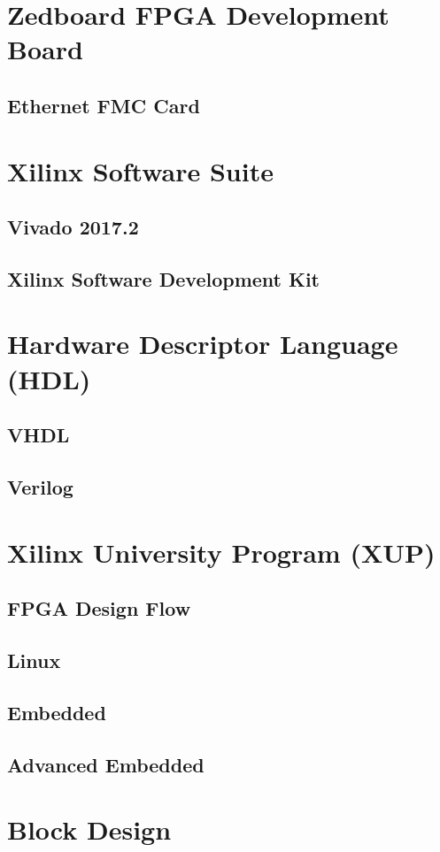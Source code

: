\section{Zedboard FPGA Development Board}
\subsection{Ethernet FMC Card}
\section{Xilinx Software Suite}
\subsection{Vivado 2017.2}
\subsection{Xilinx Software Development Kit}
\section{Hardware Descriptor Language (HDL)}
\subsection{VHDL}
\subsection{Verilog}
\section{Xilinx University Program (XUP)}
\subsection{FPGA Design Flow}
\subsection{Linux}
\subsection{Embedded}
\subsection{Advanced Embedded}
\section{Block Design}
